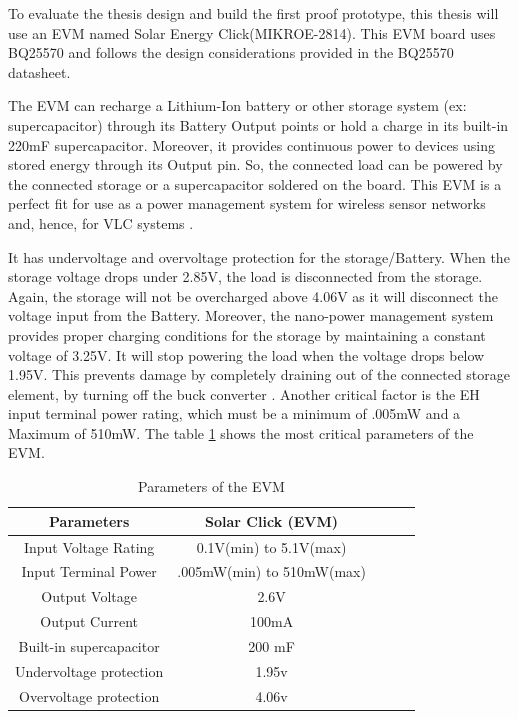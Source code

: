 To evaluate the thesis design and build the first proof prototype, this thesis will use an \ac{EVM} named Solar Energy Click(MIKROE-2814). This \ac{EVM} board uses BQ25570 and follows the design considerations provided in the BQ25570 datasheet.

The \ac{EVM} can recharge a Lithium-Ion battery or other storage system (ex: supercapacitor) through its Battery Output points or hold a charge in its built-in 220mF supercapacitor. Moreover, it provides continuous power to devices using stored energy through its Output pin. So, the connected load can be powered by the connected storage or a supercapacitor soldered on the board. This \ac{EVM} is a perfect fit for use as a power management system for wireless sensor networks and, hence, for \ac{VLC} systems \cite{solar}.

It has undervoltage and overvoltage protection for the storage/Battery. When the storage voltage drops under 2.85V, the load is disconnected from the storage. Again, the storage will not be overcharged above 4.06V as it will disconnect the voltage input from the Battery. Moreover, the nano-power management system provides proper charging conditions for the storage by maintaining a constant voltage of 3.25V\cite{solar}. It will stop powering the load when the voltage drops below 1.95V. This prevents damage by completely draining out of the connected storage element, by turning off the buck converter \cite{solar}\cite{slusbh2}. Another critical factor is the \ac{EH} input terminal power rating, which must be a minimum of .005mW and a Maximum of 510mW\cite{solar}. The table \ref{tab:4.6} shows the most critical parameters of the \ac{EVM}.

\begin{table}
    \centering
    \caption{Parameters of the EVM}
    \begin{tabular}{|c|c|c|c|c|}
         \hline
         \textbf{Parameters} &\textbf{Solar Click (EVM)}  \\
         \hline
         Input Voltage Rating  &0.1V(min) to 5.1V(max)  \\
         \hline
         Input Terminal Power  &.005mW(min) to 510mW(max)  \\
         \hline
         Output Voltage  &2.6V \\
         \hline
         Output Current &100mA  \\
         \hline
         Built-in supercapacitor  &200 mF  \\
         \hline
         Undervoltage protection  & 1.95v \\
         \hline
         Overvoltage protection  & 4.06v \\
         \hline
    \end{tabular}
    \label{tab:4.6}
\end{table}
 

